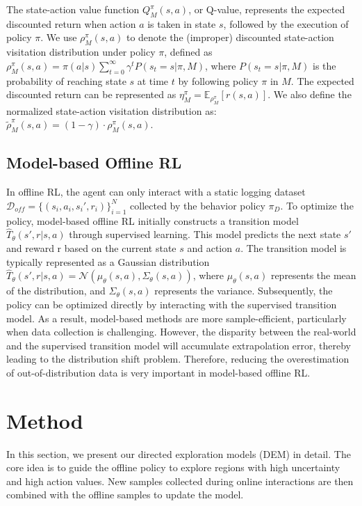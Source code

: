 \documentclass[conference]{IEEEtran}
\begin{document}
The state-action value function \( Q_M^\pi(s, a) \), or Q-value, represents the expected discounted return when action \( a \) is taken in state \( s \), followed by the execution of policy \( \pi \). We use \( \rho_M^\pi(s, a) \) to denote the (improper) discounted state-action visitation distribution under policy \( \pi \), defined as
\(
\rho_M^\pi(s, a) = \pi(a|s) \sum_{t=0}^\infty \gamma^t P(s_t = s | \pi, M)
\),
where \( P(s_t=s | \pi, M) \) is the probability of reaching state \( s \) at time \( t \) by following policy \( \pi \) in \( M \). The expected discounted return can be represented as
\(
\eta_M^\pi = \mathbb{E}_{\rho_M^\pi} \left[ r(s, a) \right]
\).
We also define the normalized state-action visitation distribution as:
\(
\tilde{\rho}_M^\pi(s, a) = (1 - \gamma) \cdot \rho_M^\pi(s, a)
\).

\subsection{Model-based Offline RL}

In offline RL, the agent can only interact with a static logging dataset $\mathcal{D}_{off} = \{(s_i, a_i, s_i', r_i)\}_{i=1}^N$ collected by the behavior policy $\pi_D$. To optimize the policy, model-based offline RL initially constructs a transition model $\hat{T}_{\theta}(s', r|s, a)$ through supervised learning. This model predicts the next state $s'$ and reward r based on the current state $s$ and action $a$. The transition model is typically represented as a Gaussian distribution $\hat{T}_{\theta}(s', r|s, a) = \mathcal{N}(\mu_{\theta}(s, a),\Sigma_{\theta}(s, a))$, where $\mu_{\theta}(s, a)$ represents the mean of the distribution, and $\Sigma_{\theta}(s, a)$ represents the variance. Subsequently, the policy can be optimized directly by interacting with the supervised transition model. As a result, model-based methods are more sample-efficient, particularly when data collection is challenging. However, the disparity between the real-world and the supervised transition model will accumulate extrapolation error, thereby leading to the distribution shift problem. Therefore, reducing the overestimation of out-of-distribution data is very important in model-based offline RL.

\section{Method}
In this section, we present our directed exploration models (DEM) in detail. The core idea is to guide the offline policy to explore regions with high uncertainty and high action values. New samples collected during online interactions are then combined with the offline samples to update the model.
\end{document}
